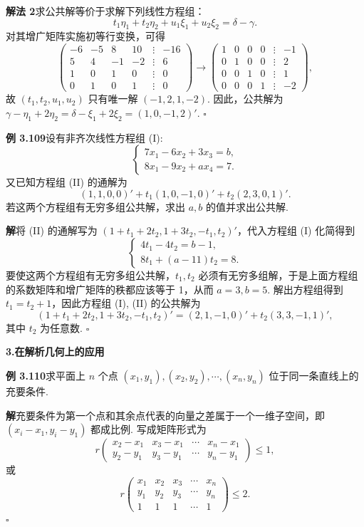 \documentclass[UTF8, 12pt, fontset=fandol, oneside]{ctexart}
\begin{document}
\noindent\textbf{解法 2}\quad 求公共解等价于求解下列线性方程组：
\[
t_1\eta_1+t_2\eta_2+u_1\xi_1+u_2\xi_2=\delta-\gamma.
\]
对其增广矩阵实施初等行变换，可得
\[
\begin{pmatrix}
-6&-5&8&10&\vdots&-16\\
5&4&-1&-2&\vdots&6\\
1&0&1&0&\vdots&0\\
0&1&0&1&\vdots&0
\end{pmatrix}
\to
\begin{pmatrix}
1&0&0&0&\vdots&-1\\
0&1&0&0&\vdots&2\\
0&0&1&0&\vdots&1\\
0&0&0&1&\vdots&-2
\end{pmatrix},
\]
故 $(t_1,t_2,u_1,u_2)$ 只有唯一解 $(-1,2,1,-2)$. 因此，公共解为 $\gamma-\eta_1+2\eta_2=\delta-\xi_1+2\xi_2=(1,0,-1,2)'$. $\square$

\noindent\textbf{例 3.109}\quad 设有非齐次线性方程组 (I):
\[
\begin{cases}
7x_1-6x_2+3x_3=b,\\
8x_1-9x_2+ax_4=7.
\end{cases}
\]
又已知方程组 (II) 的通解为
\[
(1,1,0,0)'+t_1(1,0,-1,0)'+t_2(2,3,0,1)'.
\]
若这两个方程组有无穷多组公共解，求出 $a,b$ 的值并求出公共解.

\noindent\textbf{解}\quad 将 (II) 的通解写为 $(1+t_1+2t_2,1+3t_2,-t_1,t_2)'$，代入方程组 (I) 化简得到
\[
\begin{cases}
4t_1-4t_2=b-1,\\
8t_1+(a-11)t_2=8.
\end{cases}
\]
要使这两个方程组有无穷多组公共解，$t_1,t_2$ 必须有无穷多组解，于是上面方程组的系数矩阵和增广矩阵的秩都应该等于 1，从而 $a=3,b=5$. 解出方程组得到 $t_1=t_2+1$，因此方程组 (I), (II) 的公共解为
\[
(1+t_1+2t_2,1+3t_2,-t_1,t_2)'=(2,1,-1,0)'+t_2(3,3,-1,1)',
\]
其中 $t_2$ 为任意数. $\square$

\noindent\textbf{3.\quad 在解析几何上的应用}

\noindent\textbf{例 3.110}\quad 求平面上 $n$ 个点 $(x_1,y_1),(x_2,y_2),\cdots,(x_n,y_n)$ 位于同一条直线上的充要条件.

\noindent\textbf{解}\quad 充要条件为第一个点和其余点代表的向量之差属于一个一维子空间，即 $(x_i-x_1,y_i-y_1)$ 都成比例. 写成矩阵形式为
\[
r\begin{pmatrix}
x_2-x_1&x_3-x_1&\cdots&x_n-x_1\\
y_2-y_1&y_3-y_1&\cdots&y_n-y_1
\end{pmatrix}\le 1,
\]
或
\[
r\begin{pmatrix}
x_1&x_2&x_3&\cdots&x_n\\
y_1&y_2&y_3&\cdots&y_n\\
1&1&1&\cdots&1
\end{pmatrix}\le 2.
\]
$\square$
\end{document}
